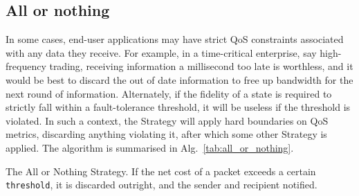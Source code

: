 \documentclass[aps,rmp,twocolumn,amsmath,amssymb,nofootinbib,superscriptaddress,longbibliography,floatfix]{revtex4-1}
\begin{document}
%
%

\subsection{All or nothing} \label{sec:all_or_nothing}

In some cases, end-user applications may have strict QoS constraints associated with any data they receive. For example, in a time-critical enterprise, say high-frequency trading, receiving information a millisecond too late is worthless, and it would be best to discard the out of date information to free up bandwidth for the next round of information. Alternately, if the fidelity of a state is required to strictly fall within a fault-tolerance threshold, it will be useless if the threshold is violated. In such a context, the {\sc Strategy} will apply hard boundaries on QoS metrics, discarding anything violating it, after which some other {\sc Strategy} is applied. The algorithm is summarised in Alg.~\ref{tab:all_or_nothing}.

\begin{table}[!htb]
\caption{The {\sc All or Nothing Strategy}. If the net cost of a packet exceeds a certain {\tt threshold}, it is discarded outright, and the sender and recipient notified.} \label{tab:all_or_nothing}
\end{table}

%
%
\end{document}
